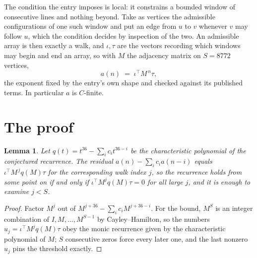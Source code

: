\documentclass[11pt,a4paper]{article}
\theoremstyle{plain}
\newtheorem{lemma}[theorem]{Lemma}
\theoremstyle{definition}
\begin{document}
The condition the entry imposes is local: it constrains a bounded window of consecutive lines and nothing beyond. Take as vertices the admissible configurations of one such window and put an edge from $u$ to $v$ whenever $v$ may follow $u$, which the condition decides by inspection of the two.
An admissible array is then exactly a walk, and $\iota,\tau$ are the vectors recording which windows may begin and end an array, so with $M$ the adjacency matrix on $S=8772$ vertices,
\[
a(n)\;=\;\iota^{\!\top}M^{\,n}\tau ,
\]
the exponent fixed by the entry's own shape and checked against its published terms. In
particular $a$ is $C$-finite.

\section{The proof}

\begin{lemma}\label{lem:crit}
Let $q(t)=t^{36}-\sum_i c_it^{36-i}$ be the characteristic polynomial of the
conjectured recurrence. The residual $a(n)-\sum_ic_ia(n-i)$ equals
$\iota^{\!\top}M^{\,j}q(M)\tau$ for the corresponding walk index $j$, so the recurrence
holds from some point on if and only if $\iota^{\!\top}M^{j}q(M)\tau=0$ for all large $j$,
and it is enough to examine $j<S$.
\end{lemma}

\begin{proof}
Factor $M^{j}$ out of $M^{j+36}-\sum_ic_iM^{j+36-i}$. For the bound, $M^{S}$
is an integer combination of $I,M,\dots,M^{S-1}$ by Cayley--Hamilton, so the numbers
$u_j=\iota^{\!\top}M^{j}q(M)\tau$ obey the monic recurrence given by the characteristic
polynomial of $M$; $S$ consecutive zeros force every later one, and the last nonzero $u_j$
pins the threshold exactly.
\end{proof}
\end{document}
